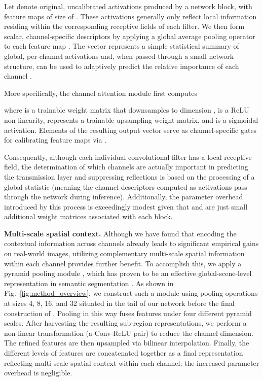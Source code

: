 \documentclass[10pt,twocolumn,letterpaper]{article}
\begin{document}
Let   denote original, uncalibrated activations produced by a network block, with  feature maps of size of .  These activations generally only reflect local information residing within the corresponding receptive fields of each filter.  We then form scalar, channel-specific descriptors  by applying a global average pooling operator  to each feature map . The vector  represents a simple statistical summary of global, per-channel activations and, when passed through a small network structure, can be used to adaptively predict the relative importance of each channel \cite{Hu_2018_CVPR}.  

More specifically, the channel attention module first computes

where  is a trainable weight matrix that downsamples  to dimension ,  is a ReLU non-linearity,  represents a trainable upsampling weight matrix, and  is a sigmoidal activation.  Elements of the resulting output vector  serve as channel-specific gates for calibrating feature maps via
.

Consequently, although each individual convolutional filter has a local receptive field, the determination of which channels are actually important in predicting the transmission layer and suppressing reflections is based on the processing of a global statistic (meaning the channel descriptors computed as activations pass through the network during inference).  Additionally, the parameter overhead introduced by this process is exceedingly modest given that  and  are just small additional weight matrices associated with each block.






\vspace{5pt}
{\noindent \bf Multi-scale spatial context.}
Although we have found that encoding the contextual information across channels already leads to significant empirical gains on real-world images, utilizing complementary multi-scale spatial information within each channel provides further benefit.  To accomplish this, we apply a pyramid pooling module \cite{He2015Spatial}, which has proven to be an effective global-scene-level representation in semantic segmentation \cite{zhao2017pyramid}.  As shown in Fig.~\ref{fig:method_overview}, we construct such a module using pooling operations at sizes 4, 8, 16, and 32 situated in the tail of our network before the final construction of .  Pooling in this way fuses features under four different pyramid scales. After harvesting the resulting sub-region representations, we perform a non-linear transformation (\ie a Conv-ReLU pair) to reduce the channel dimension. The refined features are then upsampled via bilinear interpolation. Finally, the different levels of features are concatenated together as a final representation reflecting multi-scale spatial context within each channel; the increased parameter overhead is negligible.
\end{document}

